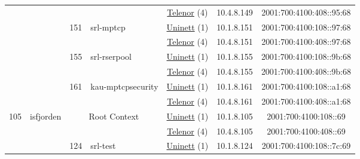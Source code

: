 \begin{small}
\begin{center}
\begin{longtable}{|c|c|c|c|c|c|c|c|}
  &  &  &  & \multicolumn{2}{|c|}{\tiny{\href{https://www.telenor.no}{Telenor} (4)}} & \tiny{10.4.8.149} & \tiny{2001:700:4100:408::95:68} \\* \cline{3-3}\cline{4-4}\cline{5-5}\cline{6-6}\cline{7-7}\cline{8-8}
  &  & \multirow{2}{*}{\tiny{151}} & \multicolumn{1}{|l|}{\multirow{2}{*}{\tiny{srl-mptcp}}} & \multicolumn{2}{|c|}{\tiny{\href{https://www.uninett.no}{Uninett} (1)}} & \tiny{10.1.8.151} & \tiny{2001:700:4100:108::97:68} \\* \cline{5-5}\cline{6-6}\cline{7-7}\cline{8-8}
  &  &  &  & \multicolumn{2}{|c|}{\tiny{\href{https://www.telenor.no}{Telenor} (4)}} & \tiny{10.4.8.151} & \tiny{2001:700:4100:408::97:68} \\* \cline{3-3}\cline{4-4}\cline{5-5}\cline{6-6}\cline{7-7}\cline{8-8}
  &  & \multirow{2}{*}{\tiny{155}} & \multicolumn{1}{|l|}{\multirow{2}{*}{\tiny{srl-rserpool}}} & \multicolumn{2}{|c|}{\tiny{\href{https://www.uninett.no}{Uninett} (1)}} & \tiny{10.1.8.155} & \tiny{2001:700:4100:108::9b:68} \\* \cline{5-5}\cline{6-6}\cline{7-7}\cline{8-8}
  &  &  &  & \multicolumn{2}{|c|}{\tiny{\href{https://www.telenor.no}{Telenor} (4)}} & \tiny{10.4.8.155} & \tiny{2001:700:4100:408::9b:68} \\* \cline{3-3}\cline{4-4}\cline{5-5}\cline{6-6}\cline{7-7}\cline{8-8}
  &  & \multirow{2}{*}{\tiny{161}} & \multicolumn{1}{|l|}{\multirow{2}{*}{\tiny{kau-mptcpsecurity}}} & \multicolumn{2}{|c|}{\tiny{\href{https://www.uninett.no}{Uninett} (1)}} & \tiny{10.1.8.161} & \tiny{2001:700:4100:108::a1:68} \\* \cline{5-5}\cline{6-6}\cline{7-7}\cline{8-8}
  &  &  &  & \multicolumn{2}{|c|}{\tiny{\href{https://www.telenor.no}{Telenor} (4)}} & \tiny{10.4.8.161} & \tiny{2001:700:4100:408::a1:68} \\ \hline
 \multirow{12}{*}{\tiny{105}} & \multicolumn{1}{|l|}{\multirow{12}{*}{\tiny{isfjorden}}} & \multicolumn{2}{|c|}{\multirow{2}{*}{\tiny{Root Context}}} & \multicolumn{2}{|c|}{\tiny{\href{https://www.uninett.no}{Uninett} (1)}} & \tiny{10.1.8.105} & \tiny{2001:700:4100:108::69} \\* \cline{5-5}\cline{6-6}\cline{7-7}\cline{8-8}
  &  & \multicolumn{2}{|c|}{} & \multicolumn{2}{|c|}{\tiny{\href{https://www.telenor.no}{Telenor} (4)}} & \tiny{10.4.8.105} & \tiny{2001:700:4100:408::69} \\* \cline{3-3}\cline{4-4}\cline{5-5}\cline{6-6}\cline{7-7}\cline{8-8}
  &  & \multirow{2}{*}{\tiny{124}} & \multicolumn{1}{|l|}{\multirow{2}{*}{\tiny{srl-test}}} & \multicolumn{2}{|c|}{\tiny{\href{https://www.uninett.no}{Uninett} (1)}} & \tiny{10.1.8.124} & \tiny{2001:700:4100:108::7c:69} \\* \cline{5-5}\cline{6-6}\cline{7-7}\cline{8-8}

\end{longtable}
\end{center}
\end{small}
